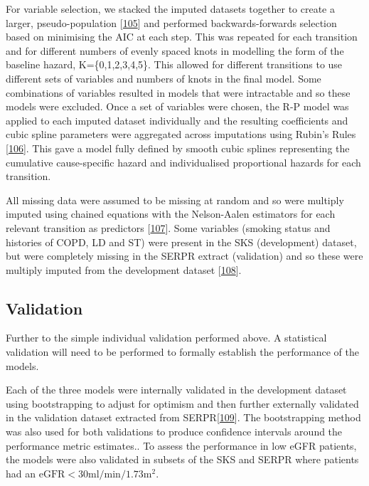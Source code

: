 \documentclass[12pt,PhD,twoside,openright]{muthesis}
\begin{document}
For variable selection, we stacked the imputed datasets together to create a larger, pseudo-population {[}\protect\hyperlink{ref-wood_how_2008}{105}{]} and performed backwards-forwards selection based on minimising the AIC at each step. This was repeated for each transition and for different numbers of evenly spaced knots in modelling the form of the baseline hazard, K=\{0,1,2,3,4,5\}. This allowed for different transitions to use different sets of variables and numbers of knots in the final model. Some combinations of variables resulted in models that were intractable and so these models were excluded. Once a set of variables were chosen, the R-P model was applied to each imputed dataset individually and the resulting coefficients and cubic spline parameters were aggregated across imputations using Rubin's Rules {[}\protect\hyperlink{ref-rubin_multiple_1984}{106}{]}. This gave a model fully defined by smooth cubic splines representing the cumulative cause-specific hazard and individualised proportional hazards for each transition.

All missing data were assumed to be missing at random and so were multiply imputed using chained equations with the Nelson-Aalen estimators for each relevant transition as predictors {[}\protect\hyperlink{ref-white_imputing_2009}{107}{]}. Some variables (smoking status and histories of COPD, LD and ST) were present in the SKS (development) dataset, but were completely missing in the SERPR extract (validation) and so these were multiply imputed from the development dataset {[}\protect\hyperlink{ref-janssen_dealing_2009}{108}{]}.

\hypertarget{validation}{%
\subsection{Validation}\label{validation}}

Further to the simple individual validation performed above. A statistical validation will need to be performed to formally establish the performance of the models.

Each of the three models were internally validated in the development dataset using bootstrapping to adjust for optimism and then further externally validated in the validation dataset extracted from SERPR{[}\protect\hyperlink{ref-schomaker_bootstrap_2018}{109}{]}. The bootstrapping method was also used for both validations to produce confidence intervals around the performance metric estimates.. To assess the performance in low eGFR patients, the models were also validated in subsets of the SKS and SERPR where patients had an \(\textrm{eGFR} < 30\textrm{ml}/\textrm{min}/1.73\textrm{m}^2\).
\end{document}

